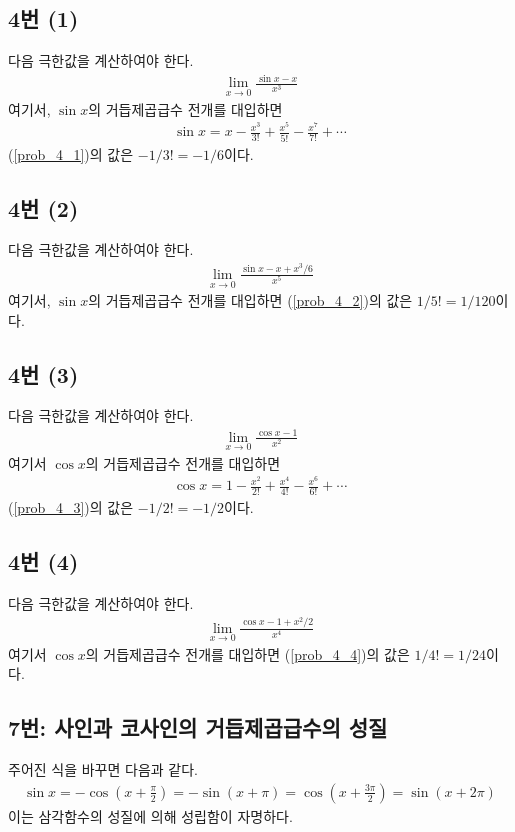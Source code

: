 \subsection{4번 (1)}
다음 극한값을 계산하여야 한다.
\begin{align}\label{prob_4_1}
\lim_{x\to0}\frac{\sin x-x}{x^3}
\end{align}
여기서, $\sin x$의 거듭제곱급수 전개를 대입하면
\begin{align*}
\sin x=x-\frac{x^3}{3!}+\frac{x^5}{5!}-\frac{x^7}{7!}+\cdots
\end{align*}
(\ref{prob_4_1})의 값은 $-1/3!=-1/6$이다.

\subsection{4번 (2)}
다음 극한값을 계산하여야 한다.
\begin{align}\label{prob_4_2}
\lim_{x\to0}\frac{\sin x-x + x^3/6}{x^5}
\end{align}
여기서, $\sin x$의 거듭제곱급수 전개를 대입하면 (\ref{prob_4_2})의 값은 $1/5!=1/120$이다.

\subsection{4번 (3)}
다음 극한값을 계산하여야 한다.
\begin{align}\label{prob_4_3}
\lim_{x\to0}\frac{\cos x-1}{x^2}
\end{align}
여기서 $\cos x$의 거듭제곱급수 전개를 대입하면
\begin{align}
\cos x=1-\frac{x^2}{2!}+\frac{x^4}{4!}-\frac{x^6}{6!}+\cdots
\end{align}
(\ref{prob_4_3})의 값은 $-1/2!=-1/2$이다.

\subsection{4번 (4)}
다음 극한값을 계산하여야 한다.
\begin{align}\label{prob_4_4}
\lim_{x\to0}\frac{\cos x-1+x^2/2}{x^4}
\end{align}
여기서 $\cos x$의 거듭제곱급수 전개를 대입하면 (\ref{prob_4_4})의 값은 $1/4!=1/24$이다.

\subsection{7번: 사인과 코사인의 거듭제곱급수의 성질}
주어진 식을 바꾸면 다음과 같다.
\begin{align*}
\sin x=-\cos\left(x+\frac{\pi}{2}\right)=-\sin\left(x+\pi\right)=\cos\left(x+\frac{3\pi}{2}\right)=\sin(x+2\pi)
\end{align*}
이는 삼각함수의 성질에 의해 성립함이 자명하다.

